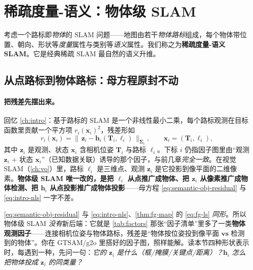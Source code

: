 \section{稀疏度量-语义：物体级 SLAM}
\label{sec:semantic-object}

考虑一个路标即\emph{物体}的 SLAM 问题——地图由若干\emph{物体路标}组成，每个物体带位置、朝向、形状等\emph{度量}属性与类别等\emph{语义}属性。我们称之为\textbf{稀疏度量-语义 SLAM}\cite{carlone2026handbook}。它是经典稀疏 SLAM 最自然的语义升维。

\subsection{从点路标到物体路标：母方程原封不动}
\label{sec:semantic-object-def}

\paragraph{把残差先摆出来。}
回忆 \cref{ch:intro}：基于路标的 SLAM 是一个非线性最小二乘，每个路标观测在目标函数里贡献一个平方项 $r_i(\mathbf{x}_i)^2$，残差形如
\begin{equation}
  r_i(\mathbf{x}_i)=\big\|\,\mathbf{z}_i-\mathbf{h}_i(\mathbf{T}_i,\boldsymbol\ell_i)\,\big\|_{\boldsymbol\Sigma_i},
  \qquad \mathbf{x}_i=(\mathbf{T}_i,\boldsymbol\ell_i),
  \label{eq:semantic-obj-residual}
\end{equation}
其中 $\mathbf{z}_i$ 是观测、状态 $\mathbf{x}_i$ 含相机位姿 $\mathbf{T}_i$ 与路标 $\boldsymbol\ell_i$\cite{carlone2026handbook}。下标 $i$ 仍指因子图里由“观测 $\mathbf{z}_i$ $+$ 状态 $\mathbf{x}_i$”（已知数据关联）诱导的那个因子，与前几章\emph{完全一致}。在视觉 SLAM（\cref{ch:vo}）里，路标 $\boldsymbol\ell_i$ 是三维点、观测 $\mathbf{z}_i$ 是它投影到像平面的二维像素。\textbf{物体级 SLAM 唯一改的，是把 $\boldsymbol\ell_i$ 从点推广成物体、把 $\mathbf{z}_i$ 从像素推广成物体检测、把 $\mathbf{h}_i$ 从点投影推广成物体投影}——母方程 \cref{eq:semantic-obj-residual} 与 \cref{eq:intro-nls} 一字不差。

\begin{insight}
\cref{eq:semantic-obj-residual} 与 \cref{eq:intro-nls}、\cref{thm:fg-map} 的 \cref{eq:fg-ls} \emph{同形}。所以物体级 SLAM \emph{没有}新后端：它就是 \cref{tab:factors} 那张“因子清单”里多了一类\textbf{物体观测因子}——连接相机位姿与物体路标，残差是“物体按位姿投到像平面 $\textbf{vs}$ 检测到的物体”。你在 GTSAM/g2o 里搭好的因子图，照样能解。读本节四种形状表示时，每遇到一种，先问一句：\emph{它的 $\mathbf{z}_i$ 是什么（框/掩膜/关键点/距离）？$\mathbf{h}_i$ 怎么把物体投成 $\mathbf{z}_i$ 的同类量？}
\end{insight}

